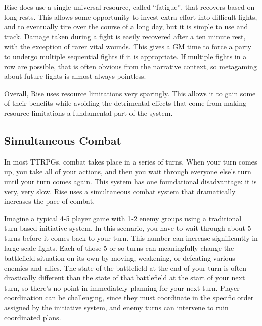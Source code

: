         Rise does use a single universal resource, called ``fatigue'', that recovers based on long rests.
        This allows some opportunity to invest extra effort into difficult fights, and to eventually tire over the course of a long day, but it is simple to use and track.
        Damage taken during a fight is easily recovered after a ten minute rest, with the exception of rarer vital wounds.
        This gives a GM time to force a party to undergo multiple sequential fights if it is appropriate.
        If multiple fights in a row are possible, that is often obvious from the narrative context, so metagaming about future fights is almost always pointless.

        Overall, Rise uses resource limitations very sparingly.
        This allows it to gain some of their benefits while avoiding the detrimental effects that come from making resource limitations a fundamental part of the system.

    \subsection{Simultaneous Combat}
        In most TTRPGs, combat takes place in a series of turns.
        When your turn comes up, you take all of your actions, and then you wait through everyone else's turn until your turn comes again.
        This system has one foundational disadvantage: it is very, very slow.
        Rise uses a simultaneous combat system that dramatically increases the pace of combat.

        Imagine a typical 4-5 player game with 1-2 enemy groups using a traditional turn-based initiative system.
        In this scenario, you have to wait through about 5 turns before it comes back to your turn.
        This number can increase significantly in large-scale fights.
        Each of those 5 or so turns can meaningfully change the battlefield situation on its own by moving, weakening, or defeating various enemies and allies.
        The state of the battlefield at the end of your turn is often drastically different than the state of that battlefield at the start of your next turn, so there's no point in immediately planning for your next turn.
        Player coordination can be challenging, since they must coordinate in the specific order assigned by the initiative system, and enemy turns can intervene to ruin coordinated plans.

